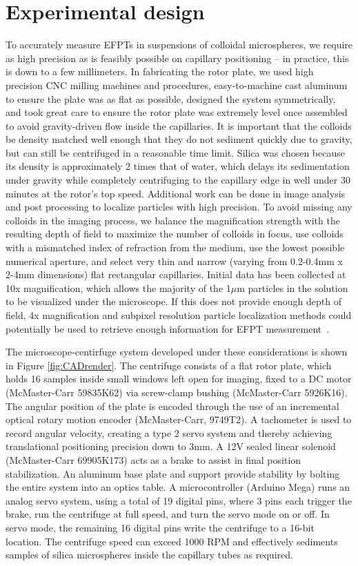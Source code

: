 \section{Experimental design}
To accurately measure EFPTs in suspensions of colloidal microspheres, we require as high precision as is feasibly possible on capillary positioning -- in practice, this is down to a few millimeters. In fabricating the rotor plate, we used high precision CNC milling machines and procedures, easy-to-machine cast aluminum to ensure the plate was as flat as possible, designed the system symmetrically, and took great care to ensure the rotor plate was extremely level once assembled to avoid gravity-driven flow inside the capillaries. It is important that the colloids be density matched well enough that they do not sediment quickly due to gravity, but can still be centrifuged in a reasonable time limit. Silica was chosen because its density is approximately 2 times that of water, which delays its sedimentation under gravity while completely centrifuging to the capillary edge in well under 30 minutes at the rotor's top speed. Additional work can be done in image analysis and post processing to localize particles with high precision. To avoid missing any colloids in the imaging process, we balance the magnification strength with the resulting depth of field to maximize the number of colloids in focus, use colloids with a mismatched index of refraction from the medium, use the lowest possible numerical aperture, and select very thin and narrow (varying from 0.2-0.4mm x 2-4mm dimensions) flat rectangular capillaries. Initial data has been collected at 10x magnification, which allows the majority of the 1$\mu$m particles in the solution to be visualized under the microscope. If this does not provide enough depth of field, 4x magnification and subpixel resolution particle localization methods could potentially be used to retrieve enough information for EFPT measurement~\cite{parthasarathy_rapid_2012}.

The microscope-centirfuge system developed under these considerations is shown in Figure \ref{fig:CADrender}. The centrifuge consists of a flat rotor plate, which holds 16 samples inside small windows left open for imaging, fixed to a DC motor (McMaster-Carr 59835K62) via screw-clamp bushing (McMaster-Carr 5926K16). The angular position of the plate is encoded through the use of an incremental optical rotary motion encoder (McMaster-Carr, 9749T2). A tachometer is used to record angular velocity, creating a type 2 servo system and thereby achieving translational positioning precision down to 3mm. A 12V sealed linear solenoid (McMaster-Carr 69905K173) acts as a brake to assist in final position stabilization. An aluminum base plate and support provide stability by bolting the entire system into an optics table. A microcontroller (Arduino Mega) runs an analog servo system, using a total of 19 digital pins, where 3 pins each trigger the brake, run the centrifuge at full speed, and turn the servo mode on or off. In servo mode, the remaining 16 digital pins write the centrifuge to a 16-bit location. The centrifuge speed can exceed 1000 RPM and effectively sediments samples of silica microspheres inside the capillary tubes as required.

